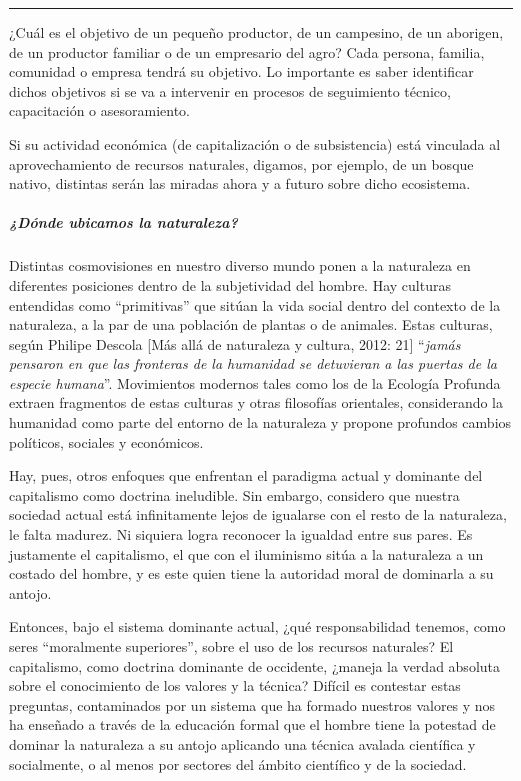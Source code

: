 \documentclass[
]{article}
\begin{document}
\begin{center}\rule{0.5\linewidth}{\linethickness}\end{center}

¿Cuál es el objetivo de un pequeño productor, de un campesino, de un
aborigen, de un productor familiar o de un empresario del agro? Cada
persona, familia, comunidad o empresa tendrá su objetivo. Lo importante
es saber identificar dichos objetivos si se va a intervenir en procesos
de seguimiento técnico, capacitación o asesoramiento.

Si su actividad económica (de capitalización o de subsistencia) está
vinculada al aprovechamiento de recursos naturales, digamos, por
ejemplo, de un bosque nativo, distintas serán las miradas ahora y a
futuro sobre dicho ecosistema.

\hypertarget{duxf3nde-ubicamos-la-naturaleza}{%
\subparagraph{¿Dónde ubicamos la
naturaleza?}\label{duxf3nde-ubicamos-la-naturaleza}}

Distintas cosmovisiones en nuestro diverso mundo ponen a la naturaleza
en diferentes posiciones dentro de la subjetividad del hombre. Hay
culturas entendidas como ``primitivas'' que sitúan la vida social dentro
del contexto de la naturaleza, a la par de una población de plantas o de
animales. Estas culturas, según Philipe Descola {[}Más allá de
naturaleza y cultura, 2012: 21{]} ``\emph{jamás pensaron en que las
fronteras de la humanidad se detuvieran a las puertas de la especie
humana}''. Movimientos modernos tales como los de la Ecología Profunda
extraen fragmentos de estas culturas y otras filosofías orientales,
considerando la humanidad como parte del entorno de la naturaleza y
propone profundos cambios políticos, sociales y económicos.

Hay, pues, otros enfoques que enfrentan el paradigma actual y dominante
del capitalismo como doctrina ineludible. Sin embargo, considero que
nuestra sociedad actual está infinitamente lejos de igualarse con el
resto de la naturaleza, le falta madurez. Ni siquiera logra reconocer la
igualdad entre sus pares. Es justamente el capitalismo, el que con el
iluminismo sitúa a la naturaleza a un costado del hombre, y es este
quien tiene la autoridad moral de dominarla a su antojo.

Entonces, bajo el sistema dominante actual, ¿qué responsabilidad
tenemos, como seres ``moralmente superiores'', sobre el uso de los
recursos naturales? El capitalismo, como doctrina dominante de
occidente, ¿maneja la verdad absoluta sobre el conocimiento de los
valores y la técnica? Difícil es contestar estas preguntas, contaminados
por un sistema que ha formado nuestros valores y nos ha enseñado a
través de la educación formal que el hombre tiene la potestad de dominar
la naturaleza a su antojo aplicando una técnica avalada científica y
socialmente, o al menos por sectores del ámbito científico y de la
sociedad.
\end{document}
